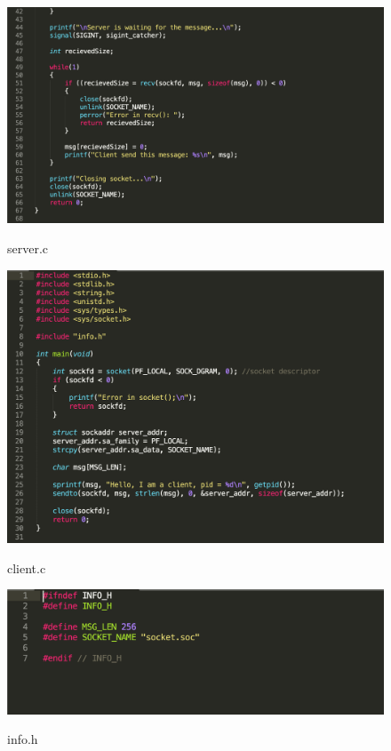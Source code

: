 \documentclass[a4paper,12pt]{article}
\begin{document}
	\newpage

	\begin{figure}[h!]
		\begin{center}
			{\includegraphics[scale = 0.6]{server2_1.png}}
			\label{ris:server2_1}
		\end{center}
		\caption{server.c}
	\end{figure}

	\begin{figure}[h!]
		\begin{center}
			{\includegraphics[scale = 0.6]{client_1.png}}
			\label{ris:client_1}
		\end{center}
		\caption{client.c}
	\end{figure}

	\begin{figure}[h!]
		\begin{center}
			{\includegraphics[scale = 0.6]{info_1.png}}
			\label{ris:info_1}
		\end{center}
		\caption{info.h}
	\end{figure}
\end{document}
